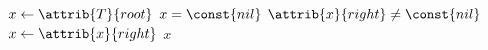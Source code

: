 \begin{codebox}
\li $x \gets \attrib{T}{root}$
\li \If $x = \const{nil}$
\li \Then
		\Return {}
\li \Else
\li 	\While $\attrib{x}{right} \neq \const{nil}$
\li 	\Do 
			$x \gets \attrib{x}{right}$
		\End
	\End
\li \Return $x$
\end{codebox}